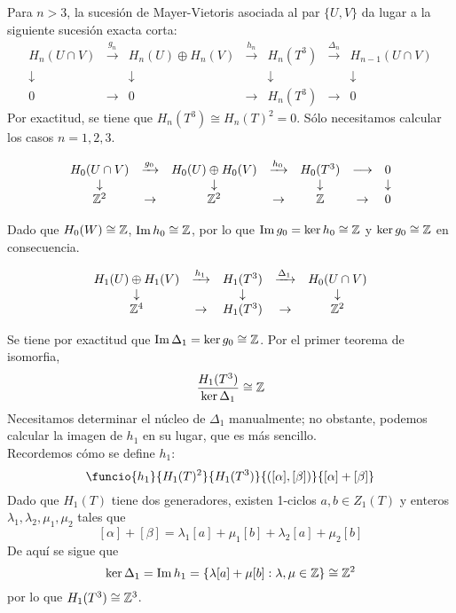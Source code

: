 Para $n > 3$, la sucesión de Mayer-Vietoris asociada al par $\{U,V\}$ da lugar a la siguiente sucesión exacta corta: \[\begin{array}{ccccccc}
H_n(U\cap V)&\xrightarrow{g_n}&H_n(U)\oplus H_n(V)	&\xrightarrow{h_n}	&H_n(T^3)		&\xrightarrow{\Delta_n}&H_{n-1}(U \cap V)\\
\downarrow&&\downarrow			&					&\downarrow	&					&\downarrow\\
0& \rightarrow&0			&\rightarrow			&H_n(T^3)		&\rightarrow			&0
\end{array}\] Por exactitud, se tiene que $H_n(T^3)\cong H_n(T)^2=0$. Sólo necesitamos calcular los casos $n=1,2,3$.

\[\begin{array}{ccccccc}
H_0(U\cap V)&\xrightarrow{g_0}&H_0(U)\oplus H_0(V)	&\xrightarrow{h_0}	&H_0(T^3)&\longrightarrow &0\\
\downarrow&					&\downarrow			&					&\downarrow & &\downarrow\\
\mathbb{Z}^2& \rightarrow&\mathbb{Z}^2			&\rightarrow			&\mathbb{Z} & \rightarrow & 0		
\end{array}\]

Dado que $H_0(W)\cong \mathbb{Z}$, $\operatorname{Im} h_0\cong \mathbb{Z}$, por lo que $\operatorname{Im} g_0=\ker h_0\cong \mathbb{Z}$ y $\ker g_0\cong \mathbb{Z}$ en consecuencia.

\[\begin{array}{ccccccc}
H_1(U)\oplus H_1(V)	&\xrightarrow{h_1}	&H_1(T^3)		&\xrightarrow{\Delta_1}&H_0(U \cap V)\\
\downarrow			&					&\downarrow		&						&\downarrow\\
\mathbb{Z}^4			&\rightarrow		&H_1(T^3)		&\rightarrow			&\mathbb{Z}^2
\end{array}\]

Se tiene por exactitud que $\operatorname{Im} \Delta_1=\ker g_0\cong \mathbb{Z}$. Por el primer teorema de isomorfia, \[\frac{H_1(T^3)}{\ker \Delta_1} \cong \mathbb{Z}\] Necesitamos determinar el núcleo de $\Delta_1$ manualmente; no obstante, podemos calcular la imagen de $h_1$ en su lugar, que es más sencillo.
\\

Recordemos cómo se define $h_1$: \[\funcio{h_1}{H_1(T)^2}{H_1(T^3)}{([\alpha],[\beta])}{[\alpha]+[\beta]}\] Dado que $H_1(T)$ tiene dos generadores, existen 1-ciclos $a,b \in Z_1(T)$ y enteros $\lambda_1,\lambda_2,\mu_1,\mu_2$ tales que \[[\alpha]+[\beta]=\lambda_1[a]+\mu_1[b]+\lambda_2[a]+\mu_2[b]\] De aquí se sigue que \[\ker \Delta_1=\operatorname{Im} h_1=\{\lambda[a]+\mu[b]: \lambda,\mu \in \mathbb{Z}\} \cong \mathbb{Z}^2\] por lo que $H_1(T^3)\cong \mathbb{Z}^3$.

